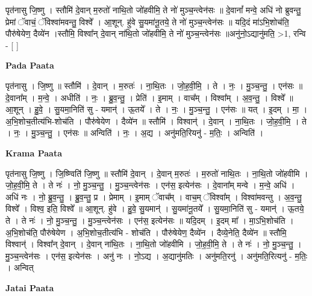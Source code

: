 \documentclass[17pt]{extarticle}
\begin{document}
पृत॑नासु जि॒ष्णु । स्तौमि॑ दे॒वान् म॒रुतो॑ नाथि॒तो जो॑हवीमि॒ ते नो॑ मुञ्च॒न्त्वेन॑सः ॥ दे॒वानां᳚ मन्वे॒ अधि॑ नो ब्रुवन्तु॒ प्रेमां ॅवाचं॒ ॅविश्वा॑मवन्तु॒ विश्वे᳚ । आ॒शून्. हु॑वे सु॒यमा॑नू॒तये॒ ते नो॑ मुञ्च॒न्त्वेन॑सः ॥ यदि॒दं मा॑ऽभि॒शोच॑ति॒ पौरु॑षेयेण॒ दैव्ये॑न ।स्तौमि॒ विश्वा᳚न् दे॒वान् ना॑थि॒तो जो॑हवीमि॒ ते नो॑ मुञ्च॒न्त्वेन॑सः ॥अनु॑नो॒ऽद्यानु॑मति॒ >1, रन्वि - [  ] \newline

\textbf{Pada Paata} \newline

पृत॑नासु । जि॒ष्णु ॥ स्तौमि॑ । दे॒वान् । म॒रुतः॑ । ना॒थि॒तः । जो॒ह॒वी॒मि॒ । ते । नः॒ । मु॒ञ्च॒न्तु॒ । एन॑सः ॥ दे॒वाना᳚म् । म॒न्वे॒ । अधीति॑ । नः॒ । ब्रु॒व॒न्तु॒ । प्रेति॑ । इ॒माम् । वाच᳚म् । विश्वा᳚म् । अ॒व॒न्तु॒ । विश्वे᳚ ॥ आ॒शून् । हु॒वे॒ । सु॒यमा॒निति॑ सु - यमान्॑ । ऊ॒तये᳚ । ते । नः॒ । मु॒ञ्च॒न्तु॒ । एन॑सः ॥ यत् । इ॒दम् । मा॒ । अ॒भि॒शोच॒तीत्य॑भि-शोच॑ति । पौरु॑षेयेण । दैव्ये॑न ॥ स्तौमि॑ । विश्वान्॑ । दे॒वान् । ना॒थि॒तः । जो॒ह॒वी॒मि॒ । ते । नः॒ । मु॒ञ्च॒न्तु॒ । एन॑सः ॥ अन्विति॑ । नः॒ । अ॒द्य । अनु॑मति॒रियनु॑ - म॒तिः॒ । अन्विति॑ ।  \newline


\textbf{Krama Paata} \newline

पृत॑नासु जि॒ष्णु । जि॒ष्ण्विति॑ जि॒ष्णु ॥ स्तौमि॑ दे॒वान् । दे॒वान् म॒रुतः॑ । म॒रुतो॑ नाथि॒तः । ना॒थि॒तो जो॑हवीमि । जो॒ह॒वी॒मि॒ ते । ते नः॑ । नो॒ मु॒ञ्च॒न्तु॒ । मु॒ञ्च॒न्त्वेन॑सः । एन॑स॒ इत्येन॑सः । दे॒वाना᳚म् मन्वे । म॒न्वे॒ अधि॑ । अधि॑ नः । नो॒ ब्रु॒व॒न्तु॒ । ब्रु॒व॒न्तु॒ प्र । प्रेमाम् । इ॒माम् ॅवाच᳚म् । वाच॒म् ॅविश्वा᳚म् । विश्वा॑मवन्तु । अ॒व॒न्तु॒ विश्वे᳚ । विश्व॒ इति॒ विश्वे᳚ ॥ आ॒शून्. हु॑वे । हु॒वे॒ सु॒यमान्॑ । सु॒यमा॑नू॒तये᳚ । सु॒यमा॒निति॑ सु - यमान्॑ । ऊ॒तये॒ ते । ते नः॑ । नो॒ मु॒ञ्च॒न्तु॒ । मु॒ञ्च॒न्त्वेन॑सः । एन॑स॒ इत्येन॑सः ॥ यदि॒दम् । इ॒दम् मा᳚ । मा॒ऽभि॒शोच॑ति । अ॒भि॒शोच॑ति॒ पौरु॑षेयेण । अ॒भि॒शोच॒तीत्य॑भि - शोच॑ति । पौरु॑षेयेण॒ दैव्ये॑न । दैव्ये॒नेति॒ दैव्ये॑न ॥ स्तौमि॒ विश्वान्॑ । विश्वा᳚न् दे॒वान् । दे॒वान् ना॑थि॒तः । ना॒थि॒तो जो॑हवीमि । जो॒ह॒वी॒मि॒ ते । ते नः॑ । नो॒ मु॒ञ्च॒न्तु॒ । मु॒ञ्च॒न्त्वेन॑सः । एन॑स॒ इत्येन॑सः । अनु॑ नः । नो॒ऽद्य । अ॒द्यानु॑मतिः । अनु॑मति॒रनु॑ । अनु॑मति॒रित्यनु॑ - म॒तिः॒ । अन्वित् \newline

\textbf{Jatai Paata} \newline
\end{document}
